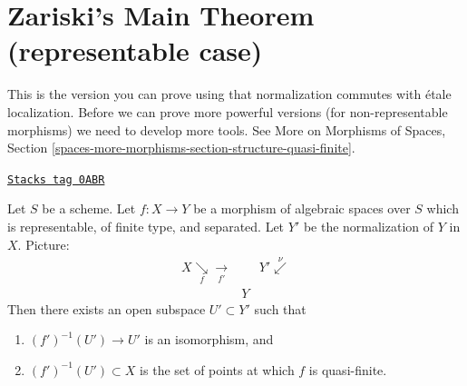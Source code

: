 \section{Zariski's Main Theorem (representable case)}
\label{spaces-morphisms-section-Zariski}
This is the version you can prove using that normalization
commutes with \'etale localization. Before we can prove more
powerful versions (for non-representable morphisms) we need to
develop more tools. See
More on Morphisms of Spaces, Section
\ref{spaces-more-morphisms-section-structure-quasi-finite}.

\begin{lemma}
\label{spaces-morphisms-lemma-finite-type-separated}
\href{https://stacks.math.columbia.edu/tag/0ABR}{\texttt{Stacks tag 0ABR}}

Let $S$ be a scheme. Let $f : X \to Y$ be a morphism of algebraic
spaces over $S$ which is representable, of finite type, and separated.
Let $Y'$ be the normalization of $Y$ in $X$. Picture:
$$
\begin{array}{ccc}X \underset{f}{\searrow}\underset{f'}{\longrightarrow} &  & Y' \overset{\nu}{\swarrow} \\  & Y & \end{array}
$$
Then there exists an open subspace $U' \subset Y'$ such that
\begin{enumerate}
\item $(f')^{-1}(U') \to U'$ is an isomorphism, and
\item $(f')^{-1}(U') \subset X$ is the set of points at which
$f$ is quasi-finite.
\end{enumerate}
\end{lemma}

